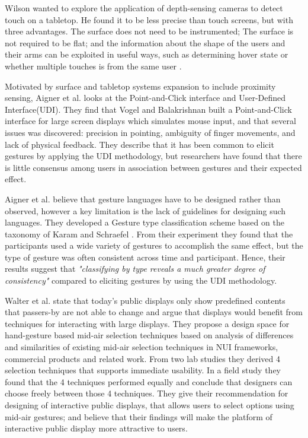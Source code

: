 Wilson \cite{Wilson:2010} wanted to explore the application of depth-sensing cameras to detect touch on a tabletop. He found it to be less precise than touch screens, but with three advantages. The surface does not need to be instrumented; The surface is not required to be flat; and the information about the shape of the users and their arms can be exploited in useful ways, such as determining hover state or whether multiple touches is from the same user \cite{Wilson:2010}.

Motivated by surface and tabletop systems expansion to include proximity sensing, Aigner et al.\cite{Aigner:2012} looks at the Point-and-Click interface and User-Defined Interface(UDI). They find that Vogel and Balakrishnan \cite{Vogel:2005} built a Point-and-Click interface for large screen displays which simulates mouse input, and that several issues was discovered: precision in pointing, ambiguity of finger movements, and lack of physical feedback. They describe that it has been common to elicit gestures by applying the UDI methodology, but researchers have found that there is little consensus among users in association between gestures and their expected effect.

Aigner et al.\cite{Aigner:2012} believe that gesture languages have to be designed rather than observed, however a key limitation is the lack of guidelines for designing such languages.
They developed a Gesture type classification scheme based on the taxonomy of Karam and Schraefel \cite{Karam:2005} .
From their experiment they found that the participants used  a  wide  variety  of  gestures  to accomplish  the  same  effect, but the  type  of  gesture was  often  consistent  across  time and participant. Hence, their results suggest that \emph{"classifying by type reveals a much greater degree of consistency"} compared to eliciting gestures by using the UDI methodology. 

Walter et al.\cite{Walter:2014} state that today's public displays only show predefined contents that passers-by are not able to change and argue that displays would benefit from techniques for interacting with large displays. They propose a design space for hand-gesture based mid-air selection techniques based on analysis of differences and similarities of existing mid-air selection techniques in NUI frameworks, commercial products and related work. From two lab studies they derived 4 selection techniques that supports immediate usability. In a field study they found that the 4 techniques performed equally and conclude that designers can choose freely between those 4 techniques.
They give their recommendation for designing of interactive public displays, that allows users to select options using mid-air gestures; and believe that their findings will make the platform of interactive public display more attractive to users.

